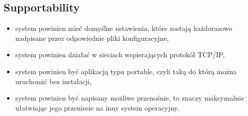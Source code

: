 \documentclass[Dokumentacja.tex]{subfiles}
\begin{document}
\subsection{Supportability}
\begin{itemize}
    \item system powinien mieć domyślne ustawienia, które zostają każdorazowo nadpisane przez odpowiednie pliki konfiguracyjne,
    \item system powinien działać w sieciach wspierających protokół TCP/IP,
    \item system powinien być aplikacją typu portable, czyli taką do którą można uruchomić bez instalacji,
    \item system powinien być napisany możliwe przenośnie, to znaczy maksymalnie ułatwiając jego przeniesie na inny system operacyjny.
\end{itemize}
\end{document}
